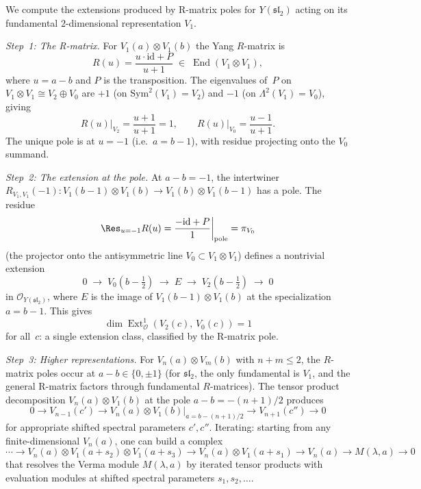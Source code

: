 \begin{computation}
\label{comp:sl2-rmatrix-ext}
We compute the extensions produced by R-matrix poles for
$Y(\mathfrak{sl}_2)$ acting on its fundamental
$2$-dimensional representation $V_1$.

\emph{Step~1: The R-matrix.}
For $V_1(a) \otimes V_1(b)$ the Yang $R$-matrix is
\begin{equation}\label{eq:sl2-rmatrix-fundamental}
R(u) = \frac{u \cdot \mathrm{id} + P}{u + 1}
\;\in\; \operatorname{End}(V_1 \otimes V_1),
\end{equation}
where $u = a - b$ and $P$ is the transposition.
The eigenvalues of~$P$ on $V_1 \otimes V_1 \cong V_2 \oplus V_0$
are $+1$ (on $\mathrm{Sym}^2(V_1) = V_2$) and $-1$
(on $\Lambda^2(V_1) = V_0$), giving
\[
R(u)\big|_{V_2} = \frac{u+1}{u+1} = 1, \qquad
R(u)\big|_{V_0} = \frac{u-1}{u+1}.
\]
The unique pole is at $u = -1$ (i.e.\ $a = b - 1$), with residue
projecting onto the $V_0$ summand.

\emph{Step~2: The extension at the pole.}
At $a - b = -1$, the intertwiner
$R_{V_1,V_1}(-1)\colon V_1(b-1) \otimes V_1(b) \to
V_1(b) \otimes V_1(b-1)$
has a pole. The residue
\[
\Res_{u = -1} R(u) = \frac{-\mathrm{id} + P}{1}
\bigg|_{\text{pole}} = \pi_{V_0}
\]
(the projector onto the antisymmetric line $V_0 \subset
V_1 \otimes V_1$) defines a nontrivial extension
\begin{equation}\label{eq:sl2-ext-fundamental}
0 \;\to\; V_0(b-\tfrac{1}{2})
\;\to\; E
\;\to\; V_2(b-\tfrac{1}{2})
\;\to\; 0
\end{equation}
in $\mathcal{O}_{Y(\mathfrak{sl}_2)}$, where $E$ is the image
of $V_1(b-1) \otimes V_1(b)$ at the specialization $a = b - 1$.
This gives
\begin{equation}\label{eq:sl2-ext1}
\dim \operatorname{Ext}^1_{\mathcal{O}}(V_2(c),\, V_0(c)) = 1
\end{equation}
for all~$c$: a single extension class, classified by the
R-matrix pole.

\emph{Step~3: Higher representations.}
For $V_n(a) \otimes V_m(b)$ with $n + m \le 2$, the
$R$-matrix poles occur at $a - b \in \{0, \pm 1\}$ (for
$\mathfrak{sl}_2$, the only fundamental is $V_1$, and the
general R-matrix factors through fundamental $R$-matrices).
The tensor product decomposition
$V_n(a) \otimes V_1(b)$ at the pole $a - b = -(n+1)/2$
produces
\[
0 \to V_{n-1}(c') \to V_n(a) \otimes V_1(b)\big|_{a = b - (n+1)/2}
\to V_{n+1}(c'') \to 0
\]
for appropriate shifted spectral parameters $c', c''$.
Iterating: starting from any finite-dimensional $V_n(a)$,
one can build a complex
\[
\cdots \to V_n(a) \otimes V_1(a+s_2) \otimes V_1(a+s_3)
\to V_n(a) \otimes V_1(a+s_1) \to V_n(a) \to M(\lambda, a) \to 0
\]
that resolves the Verma module $M(\lambda, a)$ by iterated tensor
products with evaluation modules at shifted spectral parameters
$s_1, s_2, \ldots$.


\end{computation}
